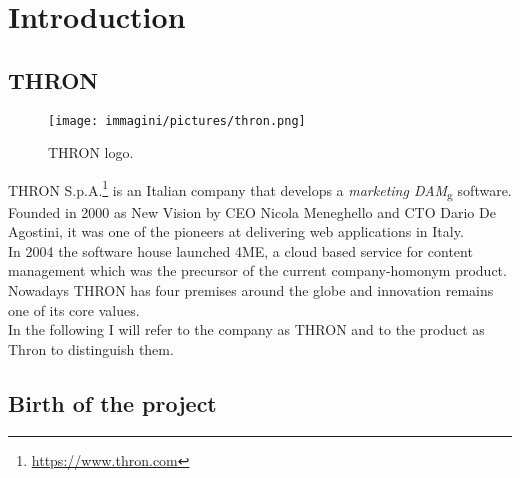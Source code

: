 	
\chapter{Introduction}
\label{chap:introduction}


\section{THRON}

\begin{figure}[htbp]
\begin{center}
\texttt{[image: immagini/pictures/thron.png]} 
\caption{THRON logo.}
\end{center}
\end{figure}

THRON S.p.A.\footnote{\url{https://www.thron.com}} is an Italian company that develops a \emph{\gls{marketing DAM}}\textsubscript{g} software. Founded in 2000 as New Vision by CEO Nicola Meneghello and CTO Dario De Agostini, it was one of the pioneers at delivering web applications in Italy. \\
In 2004 the software house launched 4ME, a cloud based service for content management which was the precursor of the current company-homonym product. \\
Nowadays THRON has four premises around the globe and innovation remains one of its core values.\\
In the following I will refer to the company as THRON and to the product as Thron to distinguish them.

\section{Birth of the project}

